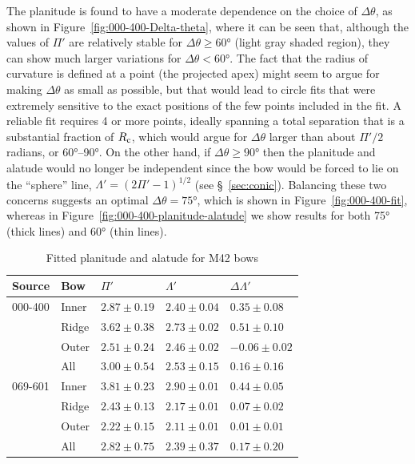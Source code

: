 The planitude is found to have a moderate dependence on the choice of
\(\Delta\theta\), as shown in Figure~\ref{fig:000-400-Delta-theta}, where it can
be seen that, although the values of \(\Pi'\) are relatively stable for
\(\Delta\theta \ge \ang{60}\) (light gray shaded region), they can show much
larger variations for \(\Delta\theta < \ang{60}\).  The fact that the radius of
curvature is defined at a point (the projected apex) might seem to
argue for making \(\Delta\theta\) as small as possible, but that would lead to
circle fits that were extremely sensitive to the exact positions of
the few points included in the fit.  A reliable fit requires 4 or more
points, ideally spanning a total separation that is a substantial
fraction of \(R_{\mathrm{c}}\), which would argue for \(\Delta\theta\) larger than about
\(\Pi'/2\) radians, or \ang{60}--\ang{90}.  On the other hand, if
\(\Delta\theta \ge \ang{90}\) then the planitude and alatude would no longer be
independent since the bow would be forced to lie on the ``sphere''
line, \(\Lambda' = (2 \Pi' - 1)^{1/2}\) (see \S~\ref{sec:conic}).  Balancing
these two concerns suggests an optimal \(\Delta\theta = \ang{75}\), which is
shown in Figure~\ref{fig:000-400-fit}, whereas in
Figure~\ref{fig:000-400-planitude-alatude} we show results for both
\ang{75} (thick lines) and \ang{60} (thin lines).


\begin{table}
  \caption[x]{Fitted planitude and alatude for M42 bows}
  \label{tab:m42-fit}
  \centering
  \begin{tabular}{ll lll}
    \toprule
    Source & Bow & \(\Pi'\) & \(\Lambda'\)& \(\Delta\Lambda'\) \\
    \midrule
    000-400 & Inner & \(2.87 \pm 0.19\) & \(2.40 \pm 0.04\) & \(0.35 \pm 0.08\) \\
           &  Ridge & \(3.62 \pm 0.38\) & \(2.73 \pm 0.02\) & \(0.51 \pm 0.10\) \\
           & Outer & \(2.51 \pm 0.24\) & \(2.46 \pm 0.02\) & \(-0.06 \pm 0.02\) \\[\smallskipamount]
           & All & \(3.00 \pm 0.54\) & \(2.53 \pm 0.15\) & \(0.16 \pm 0.16\) \\[\bigskipamount]
    069-601 & Inner & \(3.81 \pm 0.23\) & \(2.90 \pm 0.01\) & \(0.44 \pm 0.05\) \\
           & Ridge & \(2.43 \pm 0.13\) & \(2.17 \pm 0.01\) & \(0.07 \pm 0.02\) \\
           & Outer & \(2.22 \pm 0.15\) & \(2.11 \pm 0.01\) & \(0.01 \pm 0.01\) \\[\smallskipamount]
           & All & \(2.82 \pm 0.75\) & \(2.39 \pm 0.37\) & \(0.17 \pm 0.20\)\\
    \bottomrule
  \end{tabular}
\end{table}



